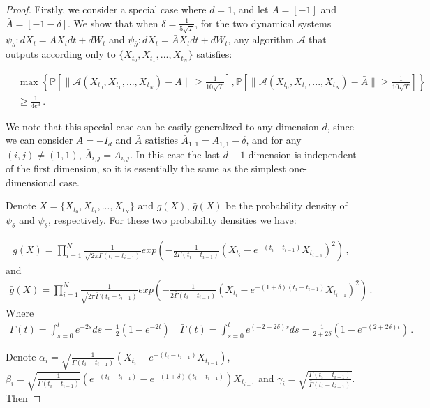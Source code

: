 \documentclass{article}
\theoremstyle{definition}
\begin{document}
	
\begin{proof}
Firstly, we consider a special case where $d=1$, and let $A=[-1]$ and $\bar{A}=[-1-\delta]$. We show that when $\delta= \frac{1}{5\sqrt{T}}$, for the two dynamical systems $\psi_{\theta}:dX_{t}=AX_{t}dt+dW_{t}$ and $\psi_{\bar{\theta}}:dX_{t}=\bar{A}X_{t}dt+dW_{t}$, any algorithm $\mathcal{A}$ that outputs according only to $\{X_{t_{0}},X_{t_{1}},...,X_{t_{N}}\}
$ satisfies:

\begin{align*}
&\max\left\{\mathbb{P}\left[\|\mathcal{A}(X_{t_{0}},X_{t_{1}},...,X_{t_{N}})-A\|\geq\frac{1}{10\sqrt{T}}     \right], \mathbb{P}\left[\|\mathcal{A}(X_{t_{0}},X_{t_{1}},...,X_{t_{N}})-\bar{A}\|\geq\frac{1}{10\sqrt{T}}     \right]   \right\}\\&\geq \frac{1}{4e^{3}}\,.
\end{align*}

We note that this special case can be easily generalized to any dimension $d$, since we can consider $A=-I_{d}$ and $\bar{A}$ satisfies $\bar{A}_{1,1}=A_{1,1}-\delta$, and for any $(i,j)\neq (1,1)$, $\bar{A}_{i,j}=A_{i,j}$. In this case the last $d-1$ dimension is independent of the first dimension, so it is essentially the same as the simplest one-dimensional case.

Denote $X=\{X_{t_{0}},X_{t_{1}},...,X_{t_{N}}\}$ and $g(X)$, $\bar{g}(X)$ be the probability density of $\psi_{\theta}$ and $\psi_{\bar{\theta}}$, respectively. For these two probability densities we have:

\begin{align*}
g(X)=\prod_{i=1}^{N}\frac{1}{\sqrt{2\pi\Gamma(t_{i}-t_{i-1})}}exp\left(-\frac{1}{2\Gamma(t_{i}-t_{i-1})}(X_{t_{i}}-e^{-(t_{i}-t_{i-1})}X_{t_{i-1}})^{2}\right)\,,
\end{align*}
and 
\begin{align*}
\bar{g}(X)=\prod_{i=1}^{N}\frac{1}{\sqrt{2\pi\bar{\Gamma}(t_{i}-t_{i-1})}}exp\left(-\frac{1}{2\bar{\Gamma}(t_{i}-t_{i-1})}(X_{t_{i}}-e^{-(1+\delta)(t_{i}-t_{i-1})}X_{t_{i-1}})^{2}\right)\,.
\end{align*}
Where 
\begin{align*}
\Gamma(t)=\int_{s=0}^{t}e^{-2s}ds=\frac{1}{2}(1-e^{-2t})\quad \bar{\Gamma}(t)=\int_{s=0}^{t}e^{(-2-2\delta)s}ds=\frac{1}{2+2\delta}(1-e^{-(2+2\delta)t})\,.
\end{align*}

Denote $\alpha_{i}=\sqrt{\frac{1}{\Gamma(t_{i}-t_{i-1})}}(X_{t_{i}}-e^{-(t_{i}-t_{i-1})}X_{t_{i-1}})$, \\$\beta_{i}=\sqrt{\frac{1}{\Gamma(t_{i}-t_{i-1})}}(e^{-(t_{i}-t_{i-1})}-e^{-(1+\delta)(t_{i}-t_{i-1})})X_{t_{i-1}}$ and $\gamma_{i}=\sqrt{\frac{\Gamma(t_{i}-t_{i-1})}{\bar{\Gamma}(t_{i}-t_{i-1})}}$. Then


\end{proof}
\end{document}
